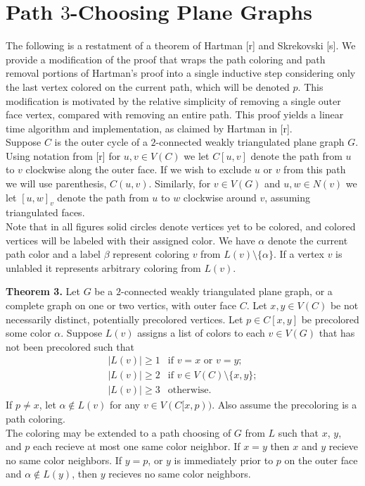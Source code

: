 \documentclass[11pt,letter]{article}
\begin{document}
\section{Path $3$-Choosing Plane Graphs}

The following is a restatment of a theorem of Hartman [r] and Skrekovski [s]. We provide a modification of
the proof that wraps the path coloring and path removal portions of Hartman's proof into a single inductive
step considering only the last vertex colored on the current path, which will be denoted $p$. This modification
is motivated by the relative simplicity of removing a single outer face vertex, compared with removing an entire
path. This proof yields a linear time algorithm and implementation, as claimed by Hartman in [r].\\

\noindent Suppose $C$ is
the outer cycle of a $2$-connected weakly triangulated plane graph $G$. Using notation from [r] for $u,v\in V(C)$
we let $C[u,v]$ denote the path from $u$ to $v$ clockwise along the outer face. If we wish to exclude $u$ or $v$
from this path we will use parenthesis, $C(u,v)$. Similarly, for $v\in V(G)$ and
$u,w\in N(v)$ we let $[u,w]_v$ denote the path from $u$ to $w$ clockwise around $v$, assuming triangulated
faces.\\

\noindent Note that in all figures solid circles denote vertices yet to be colored, and colored vertices will
be labeled with their assigned color. We have $\alpha$ denote the current path color and a label $\beta$ represent
coloring $v$ from $L(v)\setminus\{\alpha\}$. If a vertex $v$ is unlabled it represents arbitrary coloring from
$L(v)$.\\

\begin{adjustwidth}{1.5em}{1.5em}
\noindent\textbf{Theorem 3.} Let $G$ be a $2$-connected weakly triangulated plane graph, or a complete graph
on one or two vertics, with outer face $C$. 
Let $x,y\in V(C)$ be not necessarily distinct, potentially precolored vertices. Let $p\in C[x,y]$ be precolored some
color $\alpha$. Suppose $L(v)$ assigns a list of colors to each $v\in V(G)$ that has not been precolored such that
\[
    \begin{array}{ll}
	    |L(v)|\ge 1 & \text{if } v=x \text{ or } v=y;\\
	    |L(v)|\ge 2 & \text{if } v\in V(C)\setminus\{x,y\};\\
	    |L(v)|\ge 3 & \text{otherwise.}
    \end{array}
\]
If $p\ne x$, let $\alpha\not\in L(v)$ for
any $v\in V(C[x,p))$. Also assume the precoloring is a path coloring.\\

\noindent The coloring may be extended to
a path choosing of $G$ from $L$ such that $x$, $y$, and $p$ each recieve at most one same color neighbor. If
$x=y$ then $x$ and $y$ recieve no same color neighbors. If $y=p$, or $y$ is immediately prior to
$p$ on the outer face and $\alpha\not\in L(y)$, then $y$ recieves no same color neighbors.\\
\end{adjustwidth}
\end{document}
